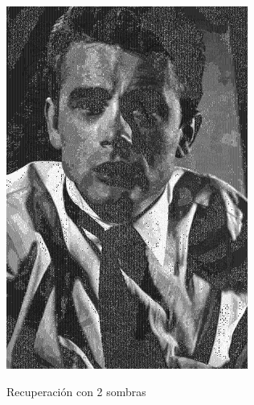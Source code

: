 \documentclass{article}
\begin{document}
\begin{figure}[h!]
{    \includegraphics[scale=0.4]{./2sombras/James2.png}
  }
  \caption{Recuperación con 2 sombras}
  \label{fig:2sombras}
\end{figure}
\end{document}
